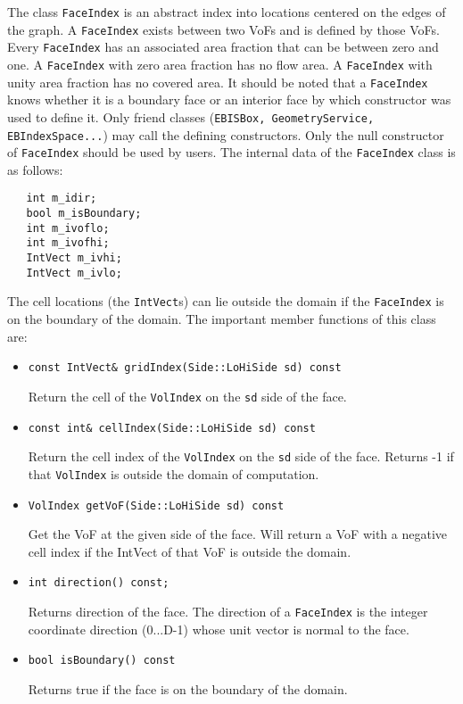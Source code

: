 The class {\tt FaceIndex} is an abstract index into locations centered
on the edges of the graph.  A {\tt FaceIndex} exists between two VoFs
and is defined by those VoFs.
Every {\tt FaceIndex} has an associated area fraction that can be
between zero and one.  A {\tt FaceIndex} with zero area fraction has no flow
area.  A {\tt FaceIndex} with unity area fraction has no covered area.
It should be noted that a {\tt FaceIndex}
knows whether it is a boundary face or an interior face
by which constructor was used to define it.  
Only friend classes 
({\tt EBISBox, GeometryService, EBIndexSpace...})
may call the defining constructors.  Only the null constructor
of {\tt FaceIndex} should be used by users.  
The internal data 
of the {\tt FaceIndex} class is as follows:
\begin{verbatim}
   int m_idir;
   bool m_isBoundary;
   int m_ivoflo;
   int m_ivofhi;
   IntVect m_ivhi;    
   IntVect m_ivlo;    
\end{verbatim}
The cell locations (the {\tt IntVect}s) can lie outside the domain
if the {\tt FaceIndex} is on the boundary of the domain.
The important member functions of this class are:
\begin{itemize}
\item \begin{verbatim} 
const IntVect& gridIndex(Side::LoHiSide sd) const
\end{verbatim} 
Return the cell of the {\tt VolIndex} on the {\tt sd}
side of the face.

\item \begin{verbatim} 
const int& cellIndex(Side::LoHiSide sd) const
\end{verbatim} 
Return the cell index of the {\tt VolIndex} on the {\tt sd}
side of the face.  Returns -1 if that {\tt VolIndex} is
outside the domain of computation.

\item \begin{verbatim} 
VolIndex getVoF(Side::LoHiSide sd) const
\end{verbatim} 
Get the VoF at the given side of the face.  Will return
a VoF with a negative cell index if the IntVect of that
VoF is outside the domain.
\item \begin{verbatim} 
int direction() const;
\end{verbatim} 
Returns direction of the face.
The direction of a {\tt FaceIndex} is the 
integer coordinate direction (0...D-1) whose
unit vector is normal to the face.
\item \begin{verbatim} 
bool isBoundary() const
\end{verbatim} 
Returns true if the face is on the boundary of the domain.
\end{itemize}


